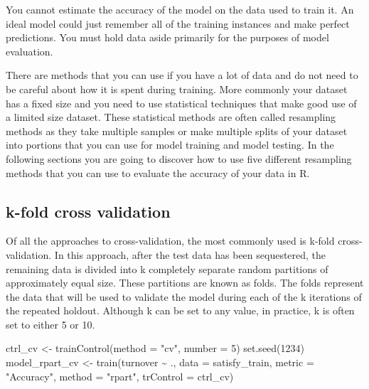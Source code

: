 \documentclass[
]{book}
\newenvironment{Shaded}{\begin{snugshade}}{\end{snugshade}}
\newcommand{\AttributeTok}[1]{\textcolor[rgb]{0.77,0.63,0.00}{#1}}
\newcommand{\DecValTok}[1]{\textcolor[rgb]{0.00,0.00,0.81}{#1}}
\newcommand{\FunctionTok}[1]{\textcolor[rgb]{0.00,0.00,0.00}{#1}}
\newcommand{\NormalTok}[1]{#1}
\newcommand{\OtherTok}[1]{\textcolor[rgb]{0.56,0.35,0.01}{#1}}
\newcommand{\SpecialCharTok}[1]{\textcolor[rgb]{0.00,0.00,0.00}{#1}}
\newcommand{\StringTok}[1]{\textcolor[rgb]{0.31,0.60,0.02}{#1}}
\begin{document}
You cannot estimate the accuracy of the model on the data used to train it. An ideal model could just remember all of the training instances and make perfect predictions. You must hold data aside primarily for the purposes of model evaluation.

There are methods that you can use if you have a lot of data and do not need to be careful about how it is spent during training. More commonly your dataset has a fixed size and you need to use statistical techniques that make good use of a limited size dataset. These statistical methods are often called resampling methods as they take multiple samples or make multiple splits of your dataset into portions that you can use for model training and model testing. In the following sections you are going to discover how to use five different resampling methods
that you can use to evaluate the accuracy of your data in R.

\hypertarget{k-fold-cross-validation-1}{%
\subsection{k-fold cross validation}\label{k-fold-cross-validation-1}}

Of all the approaches to cross-validation, the most commonly used is k-fold cross-validation. In this approach, after the test data has been sequestered, the remaining data is divided into k completely separate random partitions of approximately equal size. These partitions are known as folds. The folds represent the data that will be used to validate the model during each of the k iterations of the repeated holdout. Although k can be set to any value, in practice, k is often set to either 5 or 10.

\begin{Shaded}
\begin{Highlighting}[]
\NormalTok{ctrl\_cv }\OtherTok{\textless{}{-}} \FunctionTok{trainControl}\NormalTok{(}\AttributeTok{method =} \StringTok{"cv"}\NormalTok{, }\AttributeTok{number =} \DecValTok{5}\NormalTok{)}
\FunctionTok{set.seed}\NormalTok{(}\DecValTok{1234}\NormalTok{)}
\NormalTok{model\_rpart\_cv }\OtherTok{\textless{}{-}} \FunctionTok{train}\NormalTok{(turnover }\SpecialCharTok{\textasciitilde{}}\NormalTok{ .,}
                           \AttributeTok{data =}\NormalTok{ satisfy\_train,}
                           \AttributeTok{metric =} \StringTok{"Accuracy"}\NormalTok{,}
                           \AttributeTok{method =} \StringTok{"rpart"}\NormalTok{,}
                           \AttributeTok{trControl =}\NormalTok{ ctrl\_cv)}
\end{Highlighting}
\end{Shaded}
\end{document}
